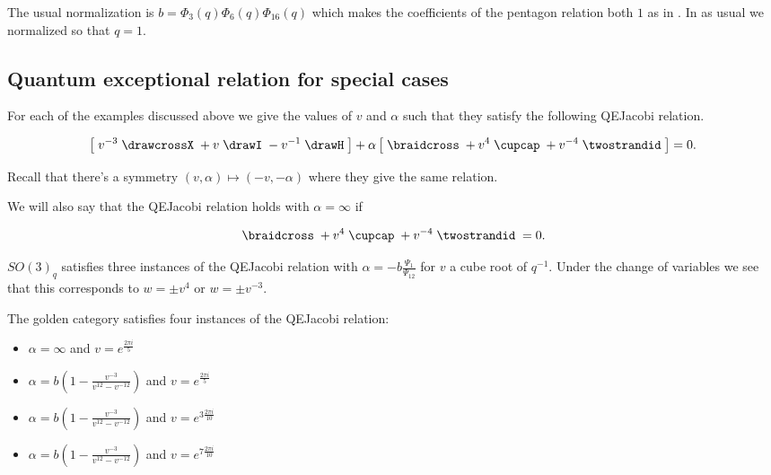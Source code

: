 \documentclass[12pt]{amsart}
\begin{document}
The usual normalization is $b = \Phi_3(q) \Phi_6(q) \Phi_{16}(q)$ which makes the coefficients of the pentagon relation both $1$ as in \cite{kuperberg}.  In \cite{trivalent} as usual we normalized so that $q=1$.






\subsection{Quantum exceptional relation for special cases}

For each of the examples discussed above we give the values of $v$ and $\alpha$ such that they satisfy the following QEJacobi relation.

\begin{equation*}
\left[\; v^{-3} \;
\drawcrossX
\;+ v \;
\drawI
\; -v^{-1} \;
 \drawH
\;\right]
 + \alpha
\left[\; \braidcross \;
 + v^{4}\;
\cupcap
\; + v^{-4} \;
 \twostrandid \;
 \right] = 0.
 \end{equation*}
 
Recall that there's a symmetry $(v,\alpha) \mapsto (-v,-\alpha)$ where they give the same relation.

We will also say that the QEJacobi relation holds with $\alpha=\infty$ if

\begin{equation*}
\braidcross \;
 + v^{4}\;
\cupcap
\; + v^{-4} \;
 \twostrandid \;= 0.
 \end{equation*}


\begin{lemma}
$SO(3)_q$ satisfies three instances of the QEJacobi relation with $\alpha = -b \frac{\Psi_1}{\Psi_{12}} $ for $v$ a cube root of $q^{-1}$.  Under the change of variables we see that this corresponds to $w = \pm v^4$ or $w = \pm v^{-3}$.
\end{lemma}

\begin{lemma}
The golden category satisfies four instances of the QEJacobi relation:
 \begin{itemize}
 \item $\alpha=\infty$ and $v = e^{\frac{2 \pi i}{5}}$
  \item $\alpha = b\left(1-\frac{v^{-3}}{v^{12}-v^{-12}}\right)$ and $v = e^{\frac{2 \pi i}{5}}$
 \item $\alpha = b\left(1-\frac{v^{-3}}{v^{12}-v^{-12}}\right)$ and $v = e^{3 \frac{2 \pi i}{10}}$
 \item $\alpha = b\left(1-\frac{v^{-3}}{v^{12}-v^{-12}}\right)$ and $v = e^{7 \frac{2 \pi i}{10}}$ 
 \end{itemize}
 \end{lemma}
\end{document}
